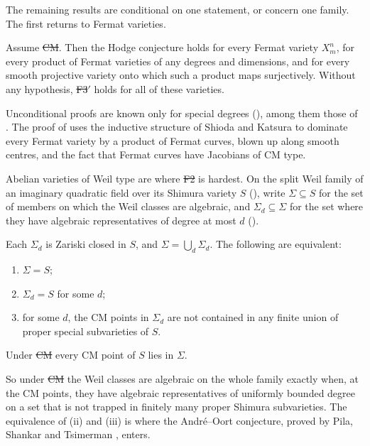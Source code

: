 The remaining results are conditional on one statement, or concern one
family. The first returns to Fermat varieties.

\begin{maintheorem}\label{thm:fermatcm}
Assume \st{CM}. Then the Hodge conjecture holds for every Fermat variety
$X^{n}_{m}$, for every product of Fermat varieties of any degrees and
dimensions, and for every smooth projective variety onto which such a
product maps surjectively. Without any hypothesis, \st{F3$'$} holds for all
of these varieties.
\end{maintheorem}

Unconditional proofs are known only for special degrees
(), among them those of
. The proof of  uses the inductive structure of Shioda and Katsura \cite{SK79}
to dominate every Fermat variety by a product of Fermat curves, blown up
along smooth centres, and the fact that Fermat curves have Jacobians of CM
type.

Abelian varieties of Weil type are where \st{F2} is hardest. On the split
Weil family of an imaginary quadratic field over its Shimura variety $S$
(), write $\Sigma\subseteq S$ for the set of members
on which the Weil classes are algebraic, and $\Sigma_{d}\subseteq\Sigma$ for
the set where they have algebraic representatives of degree at most $d$
().

\begin{maintheorem}\label{thm:weilloci}
Each $\Sigma_{d}$ is Zariski closed in $S$, and $\Sigma=\bigcup_{d}\Sigma_{d}$.
The following are equivalent:
\begin{enumerate}[label=\textup{(\roman*)}]
\item $\Sigma=S$;
\item $\Sigma_{d}=S$ for some $d$;
\item for some $d$, the CM points in $\Sigma_{d}$ are not contained in any
finite union of proper special subvarieties of $S$.
\end{enumerate}
Under \st{CM} every CM point of $S$ lies in $\Sigma$.
\end{maintheorem}

So under \st{CM} the Weil classes are algebraic on the whole family exactly
when, at the CM points, they have algebraic representatives of uniformly
bounded degree on a set that is not trapped in finitely many proper Shimura
subvarieties. The equivalence of (ii) and (iii) is where the
Andr\'e--Oort conjecture, proved by Pila, Shankar and Tsimerman
\cite{PST21}, enters.

